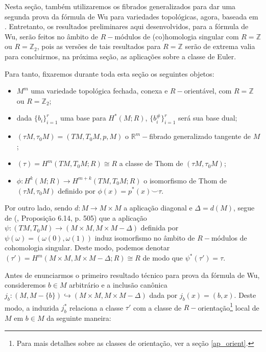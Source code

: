 \documentclass[12pt,oneside]{book} %
\newcommand{\R}{\mathbb{R}}
\newcommand{\Z}{\mathbb{Z}}
\newcommand{\ccup}{\smile}
\begin{document}
\par Nesta seção, também utilizaremos os fibrados generalizados para dar uma segunda prova da fórmula de Wu para variedades topológicas, agora, baseada em \cite{milnor_1}. Entretanto, os resultados preliminares aqui desenvolvidos, para a fórmula de Wu, serão feitos no âmbito de $R-$módulos de (co)homologia singular com $R=\Z$ ou $R=\Z_{2}$, pois as versões de tais resultados para $R=\Z$ serão de extrema valia para concluirmos, na próxima seção, as aplicações sobre a classe de Euler.

\par Para tanto, fixaremos durante toda esta seção os seguintes objetos:

\begin{itemize}
	\item $M^{m}$ uma variedade topológica fechada, conexa e $R-$orientável, com $R=\Z$ ou $R=\Z_{2}$;
	\item dada $\{b_{i}\}_{i=1}^{r}$ uma base para $H^{*}(M;R)$, $\{b_{i}^{\#}\}_{i=1}^{r}$ será sua base dual;
	\item $(\tau M,\tau_{0}M)=(TM,T_{0}M,p,M)$ o $\R^{m}-$fibrado generalizado tangente de $M$;
	\item $(\tau)=H^{m}(TM,T_{0}M;R)\cong R$ a classe de Thom de $(\tau M,\tau_{0}M)$;
	\item $\phi:H^{k}(M;R)\to H^{m+k}(TM,T_{0}M;R)$ o isomorfismo de Thom de $(\tau M,\tau_{0}M)$ definido por $\phi(x)=p^{*}(x)\ccup \tau$.
\end{itemize}

\par Por outro lado, sendo $d:M\to M\times M$ a aplicação diagonal e $\Delta=d(M)$, segue de (\cite{fadell_1}, Proposição 6.14, p. 505) que a aplicação $\psi:(TM,T_{0}M)\to (M\times M,M\times M-\Delta)$ definida por $\psi(\omega)=(\omega(0),\omega(1))$ induz isomorfismo no âmbito de $R-$módulos de cohomologia singular. Deste modo, podemos denotar $(\tau')=H^{m}(M\times M,M\times M-\Delta;R)\cong R$ de modo que $\psi^{*}(\tau')=\tau$.

\par Antes de enunciarmos o primeiro resultado técnico para prova da fórmula de Wu, consideremos $b\in M$ arbitrário e a inclusão canônica $j_{b}:(M,M-\{b\})\hookrightarrow (M\times M,M\times M-\Delta)$ dada por $j_{b}(x)=(b,x)$. Deste modo, a induzida $j_{b}^{*}$ relaciona a classe $\tau'$ com a classe de $R-$orientação\footnote{Para mais detalhes sobre as classes de orientação, ver a seção \ref{ap_orient}.} local de $M$ em $b\in M$ da seguinte maneira:
\end{document}
